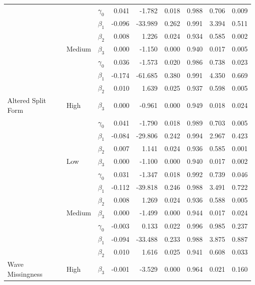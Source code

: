 \documentclass{svjour3}\usepackage[]{graphicx}\usepackage[]{color}
\newenvironment{knitrout}{}{} %
\begin{document}
\begin{knitrout}
\begin{table}[!h]
{\begin{tabular}[t]{l|l|l|r|r|r|r|r|r}
\cline{2-9}
 &  & $\gamma_0$ & 0.041 & -1.782 & 0.018 & 0.988 & 0.706 & 0.009\\
\cline{3-9}
 &  & $\beta_1$ & -0.096 & -33.989 & 0.262 & 0.991 & 3.394 & 0.511\\
\cline{3-9}
 &  & $\beta_2$ & 0.008 & 1.226 & 0.024 & 0.934 & 0.585 & 0.002\\
\cline{3-9}
 & \multirow{-4}{*}{\raggedright\arraybackslash Medium} & $\beta_3$ & 0.000 & -1.150 & 0.000 & 0.940 & 0.017 & 0.005\\
\cline{2-9}
 &  & $\gamma_0$ & 0.036 & -1.573 & 0.020 & 0.986 & 0.738 & 0.023\\
\cline{3-9}
 &  & $\beta_1$ & -0.174 & -61.685 & 0.380 & 0.991 & 4.350 & 0.669\\
\cline{3-9}
 &  & $\beta_2$ & 0.010 & 1.639 & 0.025 & 0.937 & 0.598 & 0.005\\
\cline{3-9}
\multirow{-12}{*}{\raggedright\arraybackslash Altered Split Form} & \multirow{-4}{*}{\raggedright\arraybackslash High} & $\beta_3$ & 0.000 & -0.961 & 0.000 & 0.949 & 0.018 & 0.024\\
\cline{1-9}
 &  & $\gamma_0$ & 0.041 & -1.790 & 0.018 & 0.989 & 0.703 & 0.005\\
\cline{3-9}
 &  & $\beta_1$ & -0.084 & -29.806 & 0.242 & 0.994 & 2.967 & 0.423\\
\cline{3-9}
 &  & $\beta_2$ & 0.007 & 1.141 & 0.024 & 0.936 & 0.585 & 0.001\\
\cline{3-9}
 & \multirow{-4}{*}{\raggedright\arraybackslash Low} & $\beta_3$ & 0.000 & -1.100 & 0.000 & 0.940 & 0.017 & 0.002\\
\cline{2-9}
 &  & $\gamma_0$ & 0.031 & -1.347 & 0.018 & 0.992 & 0.739 & 0.046\\
\cline{3-9}
 &  & $\beta_1$ & -0.112 & -39.818 & 0.246 & 0.988 & 3.491 & 0.722\\
\cline{3-9}
 &  & $\beta_2$ & 0.008 & 1.269 & 0.024 & 0.936 & 0.588 & 0.005\\
\cline{3-9}
 & \multirow{-4}{*}{\raggedright\arraybackslash Medium} & $\beta_3$ & 0.000 & -1.499 & 0.000 & 0.944 & 0.017 & 0.024\\
\cline{2-9}
 &  & $\gamma_0$ & -0.003 & 0.133 & 0.022 & 0.996 & 0.985 & 0.237\\
\cline{3-9}
 &  & $\beta_1$ & -0.094 & -33.488 & 0.233 & 0.988 & 3.875 & 0.887\\
\cline{3-9}
 &  & $\beta_2$ & 0.010 & 1.616 & 0.025 & 0.941 & 0.608 & 0.033\\
\cline{3-9}
\multirow{-12}{*}{\raggedright\arraybackslash Wave Missingness} & \multirow{-4}{*}{\raggedright\arraybackslash High} & $\beta_3$ & -0.001 & -3.529 & 0.000 & 0.964 & 0.021 & 0.160\\
\hline
\end{tabular}}
\end{table}


\end{knitrout}
\end{document}
